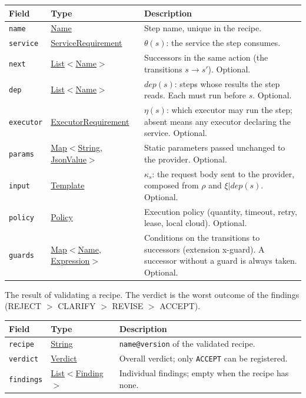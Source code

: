 \documentclass[a4paper]{arrowhead}
\newcommand{\mref}[1]{{\textcolor{ArrowheadPurple}{\hyperref[sec:model:#1]{#1}}}}
\newcommand{\pref}[1]{{\textcolor{ArrowheadGrey}{\hyperref[sec:model:primitives:#1]{#1}}}}
\begin{document}
{\small
\begin{longtable}{|p{3.9cm}|p{4.4cm}|p{7.5cm}|}

\hline
\rowcolor{gray!33} Field & Type & Description \\ \hline
\endhead
\texttt{name} & \pref{Name} & Step name, unique in the recipe. \\ \hline
\texttt{service} & \mref{ServiceRequirement} & $\theta(s)$: the service the step consumes. \\ \hline
\texttt{next} & \pref{List}$<$\pref{Name}$>$ & Successors in the same action (the transitions $s \rightarrow s'$). Optional. \\ \hline
\texttt{dep} & \pref{List}$<$\pref{Name}$>$ & $dep(s)$: steps whose results the step reads. Each must run before $s$. Optional. \\ \hline
\texttt{executor} & \mref{ExecutorRequirement} & $\eta(s)$: which executor may run the step; absent means any executor declaring the service. Optional. \\ \hline
\texttt{params} & \pref{Map}$<$\pref{String}, \pref{JsonValue}$>$ & Static parameters passed unchanged to the provider. Optional. \\ \hline
\texttt{input} & \pref{Template} & $\kappa_s$: the request body sent to the provider, composed from $\rho$ and $\xi|dep(s)$. Optional. \\ \hline
\texttt{policy} & \mref{Policy} & Execution policy (quantity, timeout, retry, lease, local cloud). Optional. \\ \hline
\texttt{guards} & \pref{Map}$<$\pref{Name}, \pref{Expression}$>$ & Conditions on the transitions to successors (extension x-guard). A successor without a guard is always taken. Optional. \\ \hline
\end{longtable}
}

The result of validating a recipe. The verdict is the worst outcome of the findings (REJECT $>$ CLARIFY $>$ REVISE $>$ ACCEPT).

{\small
\begin{longtable}{|p{3.9cm}|p{4.4cm}|p{7.5cm}|}

\hline
\rowcolor{gray!33} Field & Type & Description \\ \hline
\endhead
\texttt{recipe} & \pref{String} & \texttt{name@version} of the validated recipe. \\ \hline
\texttt{verdict} & \mref{Verdict} & Overall verdict; only \texttt{ACCEPT} can be registered. \\ \hline
\texttt{findings} & \pref{List}$<$\mref{Finding}$>$ & Individual findings; empty when the recipe has none. \\ \hline
\end{longtable}
}
\end{document}

